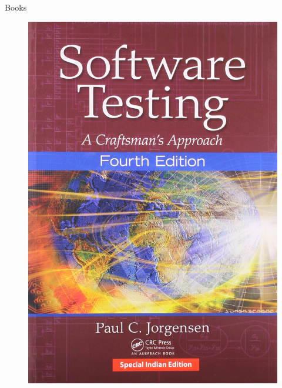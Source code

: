 \documentclass[14pt]{beamer}
\begin{document}
\begin{frame}[plain]{Books}
    \begin{figure}
        \center
        \includegraphics[height=.7\textheight]{91ihZSUhImL}
        \label{fig:91ihZSUhImL}
    \end{figure}
\end{frame}
\end{document}
